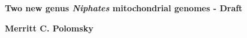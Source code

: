 \documentclass[../main.tex]{subfiles}
\begin{document}
\begin{titlepage}
   \begin{center}
       \vspace*{1cm}

       \textbf{Two new genus \emph{Niphates} mitochondrial genomes - Draft}

       \vspace{0.5cm}
       \vspace{1.5cm}

       \textbf{Merritt C. Polomsky}

       \vfill
       \vspace{0.8cm}
   \end{center}
\end{titlepage}
\end{document}
